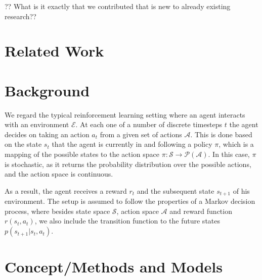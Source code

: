 \documentclass[letterpaper, 10 pt, conference]{ieeeconf}  %
\begin{document}
?? What is it exactly that we contributed that is new to already existing research??


\section{Related Work}


\section{Background}

We regard the typical reinforcement learning setting where an agent interacts with an environment $\mathcal{E}$. At each one of a number of discrete timesteps $t$ the agent decides on taking an action $a_t$ from a given set of actions $\mathcal{A}$. This is done based on the state $s_t$ that the agent is currently in and following a policy $\pi$, which is a mapping of the possible states to the action space $\pi: \mathcal{S} \rightarrow \mathcal{P}(\mathcal{A})$. In this case, $\pi$ is stochastic, as it returns the probability distribution over the possible actions, and the action space is continuous.

As a result, the agent receives a reward $r_t$ and the subsequent state $s_{t+1}$ of his environment. The setup is assumed to follow the properties of a Markov decision process, where besides state space $\mathcal{S}$, action space $\mathcal{A}$ and reward function $r(s_t,a_t)$, we also include the transition function to the future states $p(s_{t+1}|s_t,a_t)$.

\section{Concept/Methods and Models}
\end{document}
